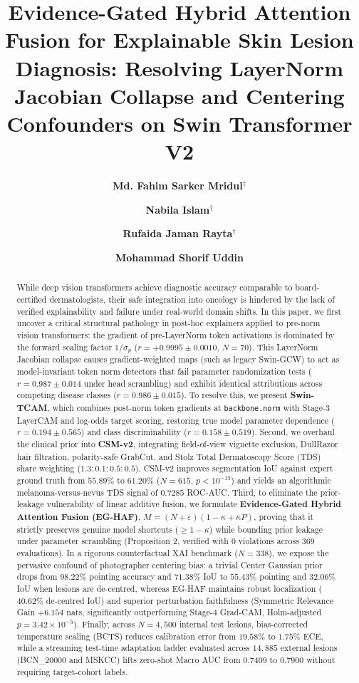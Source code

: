 \documentclass[11pt,a4paper]{article}
\title{\textbf{\Large Evidence-Gated Hybrid Attention Fusion for Explainable Skin Lesion Diagnosis: Resolving LayerNorm Jacobian Collapse and Centering Confounders on Swin Transformer V2}}
\author[1]{\textbf{Md. Fahim Sarker Mridul}$^\dagger$}
\author[1]{\textbf{Nabila Islam}$^\dagger$}
\author[1]{\textbf{Rufaida Jaman Rayta}$^\dagger$}
\author[1,*]{\textbf{Mohammad Shorif Uddin}}
\affil[1]{\small Department of Computer Science and Engineering, Jahangirnagar University, Savar, Dhaka-1342, Bangladesh}
\affil[$\dagger$]{\small These authors contributed equally to this work.}
\affil[*]{\small Corresponding Author: \texttt{shorifuddin@juniv.edu}}
\date{}
\begin{document}
\maketitle

\begin{abstract}
While deep vision transformers achieve diagnostic accuracy comparable to board-certified dermatologists, their safe integration into oncology is hindered by the lack of verified explainability and failure under real-world domain shifts. In this paper, we first uncover a critical structural pathology in post-hoc explainers applied to pre-norm vision transformers: the gradient of pre-LayerNorm token activations is dominated by the forward scaling factor $1/\sigma_p$ ($r = +0.9995 \pm 0.0010$, $N=70$). This LayerNorm Jacobian collapse causes gradient-weighted maps (such as legacy Swin-GCW) to act as model-invariant token norm detectors that fail parameter randomization tests ($r = 0.987 \pm 0.014$ under head scrambling) and exhibit identical attributions across competing disease classes ($r = 0.986 \pm 0.015$). To resolve this, we present \textbf{Swin-TCAM}, which combines post-norm token gradients at \texttt{backbone.norm} with Stage-3 LayerCAM and log-odds target scoring, restoring true model parameter dependence ($r = 0.194 \pm 0.565$) and class discriminability ($r = 0.158 \pm 0.519$). Second, we overhaul the clinical prior into \textbf{CSM-v2}, integrating field-of-view vignette exclusion, DullRazor hair filtration, polarity-safe GrabCut, and Stolz Total Dermatoscopy Score (TDS) share weighting ($1.3:0.1:0.5:0.5$). CSM-v2 improves segmentation IoU against expert ground truth from $55.89\%$ to $61.20\%$ ($N=615$, $p < 10^{-15}$) and yields an algorithmic melanoma-versus-nevus TDS signal of $0.7285$ ROC-AUC. Third, to eliminate the prior-leakage vulnerability of linear additive fusion, we formulate \textbf{Evidence-Gated Hybrid Attention Fusion (EG-HAF)}, $M = (N + \varepsilon)(1 - \kappa + \kappa P)$, proving that it strictly preserves genuine model shortcuts ($\ge 1 - \kappa$) while bounding prior leakage under parameter scrambling (Proposition 2, verified with 0 violations across 369 evaluations). In a rigorous counterfactual XAI benchmark ($N=338$), we expose the pervasive confound of photographer centering bias: a trivial Center Gaussian prior drops from $98.22\%$ pointing accuracy and $71.38\%$ IoU to $55.43\%$ pointing and $32.06\%$ IoU when lesions are de-centred, whereas EG-HAF maintains robust localization ($40.62\%$ de-centred IoU) and superior perturbation faithfulness (Symmetric Relevance Gain $+6.154$ nats, significantly outperforming Stage-4 Grad-CAM, Holm-adjusted $p = 3.42 \times 10^{-5}$). Finally, across $N=4,500$ internal test lesions, bias-corrected temperature scaling (BCTS) reduces calibration error from $19.58\%$ to $1.75\%$ ECE, while a streaming test-time adaptation ladder evaluated across $14,885$ external lesions (BCN\_20000 and MSKCC) lifts zero-shot Macro AUC from $0.7409$ to $0.7900$ without requiring target-cohort labels.
\end{abstract}
\end{document}
